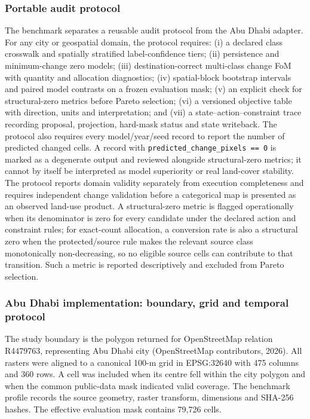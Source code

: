 \documentclass[
]{article}
\begin{document}
\subsubsection{Portable audit protocol}\label{portable-audit-protocol}

The benchmark separates a reusable audit protocol from the Abu Dhabi
adapter. For any city or geospatial domain, the protocol requires: (i) a
declared class crosswalk and spatially stratified label-confidence
tiers; (ii) persistence and minimum-change zero models; (iii)
destination-correct multi-class change FoM with quantity and allocation
diagnostics; (iv) spatial-block bootstrap intervals and paired model
contrasts on a frozen evaluation mask; (v) an explicit check for
structural-zero metrics before Pareto selection; (vi) a versioned
objective table with direction, units and interpretation; and (vii) a
state--action--constraint trace recording proposal, projection,
hard-mask status and state writeback. The protocol also requires every
model/year/seed record to report the number of predicted changed cells.
A record with \texttt{predicted\_change\_pixels\ ==\ 0} is marked as a
degenerate output and reviewed alongside structural-zero metrics; it
cannot by itself be interpreted as model superiority or real land-cover
stability. The protocol reports domain validity separately from
execution completeness and requires independent change validation before
a categorical map is presented as an observed land-use product. A
structural-zero metric is flagged operationally when its denominator is
zero for every candidate under the declared action and constraint rules;
for exact-count allocation, a conversion rate is also a structural zero
when the protected/source rule makes the relevant source class
monotonically non-decreasing, so no eligible source cells can contribute
to that transition. Such a metric is reported descriptively and excluded
from Pareto selection.

\subsubsection{Abu Dhabi implementation: boundary, grid and temporal
protocol}\label{abu-dhabi-implementation-boundary-grid-and-temporal-protocol}

The study boundary is the polygon returned for OpenStreetMap relation
R4479763, representing Abu Dhabi city (OpenStreetMap contributors,
2026). All rasters were aligned to a canonical 100-m grid in EPSG:32640
with 475 columns and 360 rows. A cell was included when its centre fell
within the city polygon and when the common public-data mask indicated
valid coverage. The benchmark profile records the source geometry,
raster transform, dimensions and SHA-256 hashes. The effective
evaluation mask contains 79,726 cells.
\end{document}

